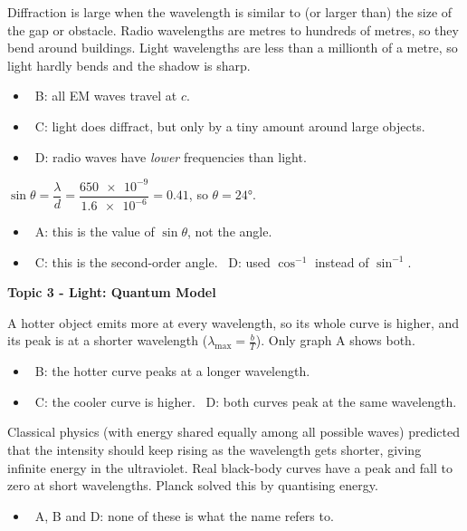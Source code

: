 \documentclass[12pt]{article}
\newcommand\anstopic[1]{\par\Needspace{8\baselineskip}\vspace{4mm}%
  \begin{center}{\headfont\bfseries\fontsize{14}{18}\selectfont #1\par}\end{center}\vspace{2pt}}
\begin{document}
\begin{practiceanswers}
\begin{practiceans}
  Diffraction is large when the wavelength is similar to (or larger than) the size of the gap or
  obstacle. Radio wavelengths are metres to hundreds of metres, so they bend around buildings. Light wavelengths are
  less than a millionth of a metre, so light hardly bends and the shadow is sharp.
  \begin{itemize}
    \item \xmark\ B: all EM waves travel at $c$.
    \item \xmark\ C: light does diffract, but only by a tiny amount around large objects.
    \item \xmark\ D: radio waves have \emph{lower} frequencies than light.
  \end{itemize}
\end{practiceans}

\begin{practiceans}
  $\sin\theta = \dfrac{\lambda}{d} = \dfrac{\num{650e-9}}{\num{1.6e-6}} = 0.41$, so $\theta = \ang{24}$.
  \begin{itemize}
    \item \xmark\ A: this is the value of $\sin\theta$, not the angle.
    \item \xmark\ C: this is the second-order angle. \quad \xmark\ D: used $\cos^{-1}$ instead of $\sin^{-1}$.
  \end{itemize}
\end{practiceans}

\anstopic{Topic 3 - Light: Quantum Model}

\begin{practiceans}
  A hotter object emits more at every wavelength, so its whole curve is higher, and its peak is at a
  shorter wavelength ($\lambda_\mathrm{max} = \frac{b}{T}$). Only graph A shows both.
  \begin{itemize}
    \item \xmark\ B: the hotter curve peaks at a longer wavelength.
    \item \xmark\ C: the cooler curve is higher. \quad \xmark\ D: both curves peak at the same wavelength.
  \end{itemize}
\end{practiceans}

\begin{practiceans}
  Classical physics (with energy shared equally among all possible waves) predicted that the intensity
  should keep rising as the wavelength gets shorter, giving infinite energy in the ultraviolet. Real
  black-body curves have a peak and fall to zero at short wavelengths. Planck solved this by
  quantising energy.
  \begin{itemize}
    \item \xmark\ A, B and D: none of these is what the name refers to.
  \end{itemize}
\end{practiceans}


\end{practiceanswers}
\end{document}
